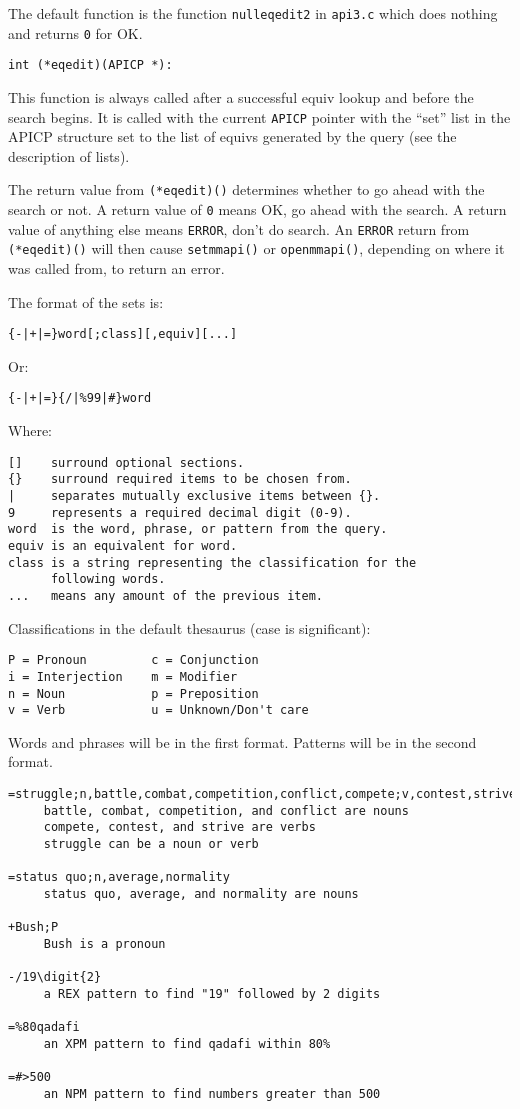 The default function is the function \verb`nulleqedit2` in
\verb`api3.c` which does nothing and returns \verb`0` for OK.

\begin{verbatim}
int (*eqedit)(APICP *):
\end{verbatim}
This function is always called after a successful equiv lookup and
before the search begins.  It is called with the current \verb`APICP`
pointer with the ``set'' list in the APICP structure set to the list
of equivs generated by the query (see the description of lists).

The return value from \verb`(*eqedit)()` determines whether to go ahead
with the search or not.  A return value of \verb`0` means OK, go ahead
with the search.  A return value of anything else means \verb`ERROR`,
don't do search.  An \verb`ERROR` return from \verb`(*eqedit)()` will then cause
\verb`setmmapi()` or \verb`openmmapi()`, depending on where it was called from,
to return an error.

The format of the sets is:
\begin{verbatim}
{-|+|=}word[;class][,equiv][...]
\end{verbatim}

Or:
\begin{verbatim}
{-|+|=}{/|%99|#}word
\end{verbatim}

Where:
\begin{verbatim}
[]    surround optional sections.
{}    surround required items to be chosen from.
|     separates mutually exclusive items between {}.
9     represents a required decimal digit (0-9).
word  is the word, phrase, or pattern from the query.
equiv is an equivalent for word.
class is a string representing the classification for the
      following words.
...   means any amount of the previous item.
\end{verbatim}

Classifications in the default thesaurus (case is significant):
\begin{verbatim}
P = Pronoun         c = Conjunction
i = Interjection    m = Modifier
n = Noun            p = Preposition
v = Verb            u = Unknown/Don't care
\end{verbatim}
Words and phrases will be in the first format.
Patterns will be in the second format.

\begin{verbatim}
=struggle;n,battle,combat,competition,conflict,compete;v,contest,strive
     battle, combat, competition, and conflict are nouns
     compete, contest, and strive are verbs
     struggle can be a noun or verb

=status quo;n,average,normality
     status quo, average, and normality are nouns

+Bush;P
     Bush is a pronoun

-/19\digit{2}
     a REX pattern to find "19" followed by 2 digits

=%80qadafi
     an XPM pattern to find qadafi within 80%

=#>500
     an NPM pattern to find numbers greater than 500
\end{verbatim}

